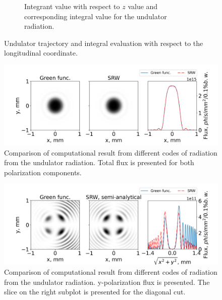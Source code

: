 \begin{figure}[p]
\begin{subfigure}[c]{0.5\linewidth}
            \caption{Integrant value with respect to $z$ value and corresponding integral value for the undulator radiation.} %
            \label{Fig:und_integral}
        \end{subfigure}
            \caption{Undulator trajectory and integral evaluation with respect to the longitudinal coordinate.} %
        \label{Fig:und_integral_and_traj}
    \end{figure}

    \begin{figure}[p]
    	\centering
        \includegraphics[width=0.71\linewidth]{content/images/5_THz_Source/und.png}
        \captionsetup{justification=centering}
        \caption{Comparison of computational result from different codes of radiation from the undulator radiation. Total flux is presented for both polarization components.}
        \label{Fig:und}
    \end{figure}

    \begin{figure}[p]
    	\centering
        \includegraphics[width=0.71\linewidth]{content/images/5_THz_Source/und_edge_on.png}
        \captionsetup{justification=centering}
        \caption{Comparison of computational result from different codes of radiation from the undulator radiation. y-polarization flux is presented. The slice on the right subplot is presented for the diagonal cut.}
        \label{Fig:und_edge_on}
    \end{figure}
    \pagebreak
    
